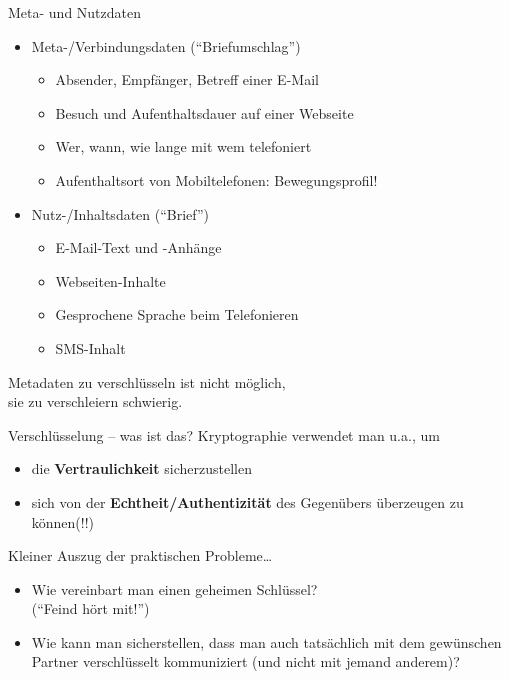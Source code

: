   \begin{frame}{Meta- und Nutzdaten}
    \begin{itemize}
      \item Meta-/Verbindungsdaten (``Briefumschlag'')
      \begin{itemize}
        \item Absender, Empfänger, Betreff einer E-Mail
        \item Besuch und Aufenthaltsdauer auf einer Webseite
        \item Wer, wann, wie lange mit wem telefoniert
        \item Aufenthaltsort von Mobiltelefonen: Bewegungsprofil!
      \end{itemize}
      \item Nutz-/Inhaltsdaten (``Brief'')
      \begin{itemize}
        \item E-Mail-Text und -Anhänge
        \item Webseiten-Inhalte
        \item Gesprochene Sprache beim Telefonieren
        \item SMS-Inhalt
      \end{itemize}
    \end{itemize}

  Metadaten zu verschlüsseln ist nicht möglich,\\ sie zu verschleiern schwierig.
  \end{frame}

  \begin{frame}{Verschlüsselung -- was ist das?}
    Kryptographie verwendet man u.a., um
    \begin{itemize}
      \item die \textbf{Vertraulichkeit} sicherzustellen
      \item sich von der \textbf{Echtheit/Authentizität} des Gegenübers überzeugen zu können(!!)
    \end{itemize}

    Kleiner Auszug der praktischen Probleme\ldots
    \begin{itemize}
      \item Wie vereinbart man einen geheimen Schlüssel?\\(``Feind hört mit!'')
      \item Wie kann man sicherstellen, dass man auch tatsächlich mit dem gewünschen Partner verschlüsselt kommuniziert (und nicht mit jemand anderem)?
    \end{itemize}
  \end{frame}

